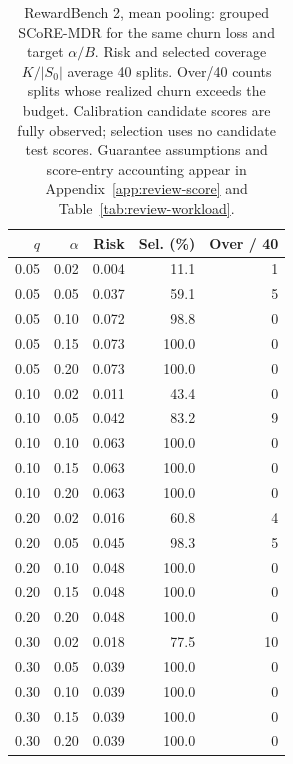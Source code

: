 \begin{table}[t]
\centering\small
\begin{tabular}{rrrrr}
\toprule
$q$ & $\alpha$ & Risk & Sel. (\%) & Over / 40 \\
\midrule
0.05 & 0.02 & 0.004 & 11.1 & 1 \\
0.05 & 0.05 & 0.037 & 59.1 & 5 \\
0.05 & 0.10 & 0.072 & 98.8 & 0 \\
0.05 & 0.15 & 0.073 & 100.0 & 0 \\
0.05 & 0.20 & 0.073 & 100.0 & 0 \\
0.10 & 0.02 & 0.011 & 43.4 & 0 \\
0.10 & 0.05 & 0.042 & 83.2 & 9 \\
0.10 & 0.10 & 0.063 & 100.0 & 0 \\
0.10 & 0.15 & 0.063 & 100.0 & 0 \\
0.10 & 0.20 & 0.063 & 100.0 & 0 \\
0.20 & 0.02 & 0.016 & 60.8 & 4 \\
0.20 & 0.05 & 0.045 & 98.3 & 5 \\
0.20 & 0.10 & 0.048 & 100.0 & 0 \\
0.20 & 0.15 & 0.048 & 100.0 & 0 \\
0.20 & 0.20 & 0.048 & 100.0 & 0 \\
0.30 & 0.02 & 0.018 & 77.5 & 10 \\
0.30 & 0.05 & 0.039 & 100.0 & 0 \\
0.30 & 0.10 & 0.039 & 100.0 & 0 \\
0.30 & 0.15 & 0.039 & 100.0 & 0 \\
0.30 & 0.20 & 0.039 & 100.0 & 0 \\
\bottomrule
\end{tabular}
\caption{RewardBench 2, mean pooling: grouped SCoRE-MDR for the same churn loss and target $\alpha/B$. Risk and selected coverage $K/|S_0|$ average 40 splits. Over/40 counts splits whose realized churn exceeds the budget. Calibration candidate scores are fully observed; selection uses no candidate test scores. Guarantee assumptions and score-entry accounting appear in Appendix~\ref{app:review-score} and Table~\ref{tab:review-workload}.}
\label{tab:review-score-0-mean}
\end{table}
